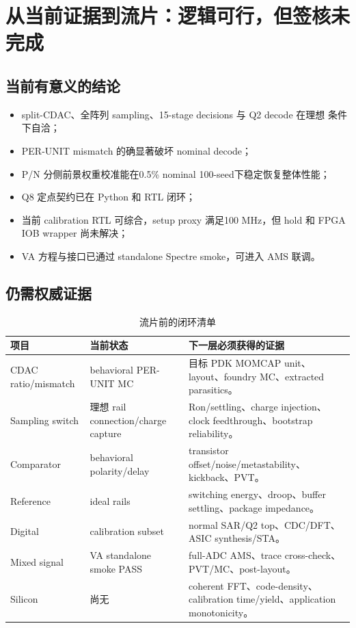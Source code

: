 \documentclass[UTF8,11pt,a4paper]{ctexart}
\newcommand{\tablehead}{\rowcolor{PaleBlue}\bfseries\sffamily\color{DeepNavy}}
\begin{document}
\section[流片可行性边界]{从当前证据到流片：逻辑可行，但签核未完成}

\subsection{当前有意义的结论}

\begin{itemize}
  \item split-CDAC、全阵列 sampling、15-stage decisions 与 Q2 decode 在理想
    条件下自洽；
  \item PER-UNIT mismatch 的确显著破坏 nominal decode；
  \item P/N 分侧前景权重校准能在0.5\% nominal 100-seed下稳定恢复整体性能；
  \item Q8 定点契约已在 Python 和 RTL 闭环；
  \item 当前 calibration RTL 可综合，setup proxy 满足100 MHz，但 hold 和
    FPGA IOB wrapper 尚未解决；
  \item VA 方程与接口已通过 standalone Spectre smoke，可进入 AMS 联调。
\end{itemize}

\subsection{仍需权威证据}

\begin{table}[htbp]
  \centering
  \caption{流片前的闭环清单}
  \begin{tabularx}{\textwidth}{@{}p{37mm}p{42mm}Y@{}}
    \toprule
    \tablehead 项目 & 当前状态 & 下一层必须获得的证据\\
    \midrule
    CDAC ratio/mismatch &
      behavioral PER-UNIT MC &
      目标 PDK MOMCAP unit、layout、foundry MC、extracted parasitics。\\
    Sampling switch &
      理想 rail connection/charge capture &
      Ron/settling、charge injection、clock feedthrough、bootstrap reliability。\\
    Comparator &
      behavioral polarity/delay &
      transistor offset/noise/metastability、kickback、PVT。\\
    Reference &
      ideal rails &
      switching energy、droop、buffer settling、package impedance。\\
    Digital &
      calibration subset &
      normal SAR/Q2 top、CDC/DFT、ASIC synthesis/STA。\\
    Mixed signal &
      VA standalone smoke PASS &
      full-ADC AMS、trace cross-check、PVT/MC、post-layout。\\
    Silicon &
      尚无 &
      coherent FFT、code-density、calibration time/yield、application monotonicity。\\
    \bottomrule
  \end{tabularx}
\end{table}
\end{document}
